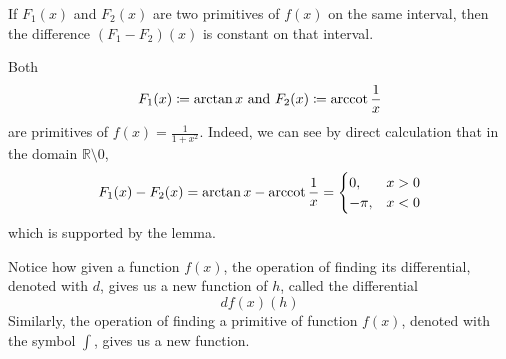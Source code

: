     \begin{lemma}
      \label{thm:primitives-differ-by-a-constant}
      If $F_1(x)$ and $F_2 (x)$ are two primitives of $f(x)$ on the same interval, then the difference $(F_1 - F_2)(x)$ is constant on that interval. 
    \end{lemma}

  \begin{example}
    \label{ex:arctanx-and-arccot1x-as-primitives}
  Both 
  \begin{equation}
    F_1(x) \coloneqq \arctan{x} \text{ and } F_2(x) \coloneqq \operatorname{arccot}{\frac{1}{x}}
  \end{equation}
  are primitives of $f(x) = \frac{1}{1 + x^2}$. Indeed, we can see by direct calculation that in the domain $\mathbb{R} \setminus 0$, 
  \begin{equation}
    F_1 (x) - F_2 (x) = \arctan{x} - \operatorname{arccot}{\frac{1}{x}} = \begin{cases}
      0, & x > 0 \\
      -\pi, & x < 0
      \end{cases}
  \end{equation}
  which is supported by the lemma. 
  \end{example}

    Notice how given a function $f(x)$, the operation of finding its differential, denoted with $d$, gives us a new function of $h$, called the differential 
    \begin{equation}
      df(x)(h)
    \end{equation}
    Similarly, the operation of finding a primitive of function $f(x)$, denoted with the symbol $\int$, gives us a new function. 

